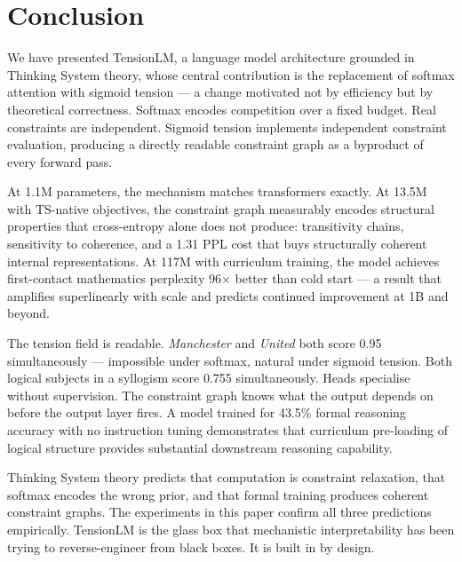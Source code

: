 \documentclass[10pt,a4paper]{article}
\begin{document}
\section{Conclusion}

We have presented TensionLM, a language model architecture grounded in Thinking System theory, whose central contribution is the replacement of softmax attention with sigmoid tension --- a change motivated not by efficiency but by theoretical correctness. Softmax encodes competition over a fixed budget. Real constraints are independent. Sigmoid tension implements independent constraint evaluation, producing a directly readable constraint graph as a byproduct of every forward pass.

At 1.1M parameters, the mechanism matches transformers exactly. At 13.5M with TS-native objectives, the constraint graph measurably encodes structural properties that cross-entropy alone does not produce: transitivity chains, sensitivity to coherence, and a 1.31 PPL cost that buys structurally coherent internal representations. At 117M with curriculum training, the model achieves first-contact mathematics perplexity 96$\times$ better than cold start --- a result that amplifies superlinearly with scale and predicts continued improvement at 1B and beyond.

The tension field is readable. \textit{Manchester} and \textit{United} both score 0.95 simultaneously --- impossible under softmax, natural under sigmoid tension. Both logical subjects in a syllogism score 0.755 simultaneously. Heads specialise without supervision. The constraint graph knows what the output depends on before the output layer fires. A model trained for 43.5\% formal reasoning accuracy with no instruction tuning demonstrates that curriculum pre-loading of logical structure provides substantial downstream reasoning capability.

Thinking System theory predicts that computation is constraint relaxation, that softmax encodes the wrong prior, and that formal training produces coherent constraint graphs. The experiments in this paper confirm all three predictions empirically. TensionLM is the glass box that mechanistic interpretability has been trying to reverse-engineer from black boxes. It is built in by design.
\end{document}
